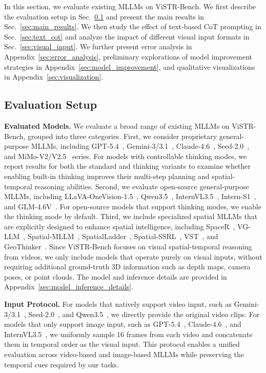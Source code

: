 In this section, we evaluate existing MLLMs on ViSTR-Bench.
We first describe the evaluation setup in Sec.~\ref{sec:evaluation_setup} and present the main results in Sec.~\ref{sec:main_results}.
We then study the effect of text-based CoT prompting in Sec.~\ref{sec:text_cot} and analyze the impact of different visual input formats in Sec.~\ref{sec:visual_input}.
We further present error analysis in Appendix~\ref{sec:error_analysis}, preliminary explorations of model improvement strategies in Appendix~\ref{sec:model_improvement}, and qualitative visualizations in Appendix~\ref{sec:visualization}.

\subsection{Evaluation Setup}
\label{sec:evaluation_setup}

\textbf{Evaluated Models.}
We evaluate a broad range of existing MLLMs on ViSTR-Bench, grouped into three categories. 
First, we consider proprietary general-purpose MLLMs, including GPT-5.4~\citep{GPT-5}, Gemini-3/3.1~\citep{Gemini}, Claude-4.6~\citep{Claude}, Seed-2.0~\citep{Seed}, and MiMo-V2/V2.5~\citep{MiMo-V2-Omni,MiMo-V2.5} series. 
For models with controllable thinking modes, we report results for both the standard and thinking variants to examine whether enabling built-in thinking improves their multi-step planning and spatial-temporal reasoning abilities. 
Second, we evaluate open-source general-purpose MLLMs, including LLaVA-OneVision-1.5~\citep{LLaVA-OneVision-1.5}, Qwen3.5~\citep{Qwen3.5}, InternVL3.5~\citep{InternVL3.5}, Intern-S1~\citep{Intern-S1,Intern-S1-Pro}, and GLM-4.6V~\citep{GLM-4.6V}.
For open-source models that support thinking modes, we enable the thinking mode by default. 
Third, we include specialized spatial MLLMs that are explicitly designed to enhance spatial intelligence, including SpaceR~\citep{SpaceR}, VG-LLM~\citep{VG-LLM}, Spatial-MLLM~\citep{Spatial-MLLM}, SpatialLadder~\citep{SpatialLadder}, Spatial-SSRL~\citep{Spatial-SSRL}, VST~\citep{VST}, and GeoThinker~\citep{GeoThinker}. 
Since ViSTR-Bench focuses on visual spatial-temporal reasoning from videos, we only include models that operate purely on visual inputs, without requiring additional ground-truth 3D information such as depth maps, camera poses, or point clouds.
The model and inference details are provided in Appendix~\ref{sec:model_inference_details}.

\textbf{Input Protocol.}
For models that natively support video input, such as Gemini-3/3.1~\citep{Gemini}, Seed-2.0~\citep{Seed}, and Qwen3.5~\citep{Qwen3.5}, we directly provide the original video clips.
For models that only support image input, such as GPT-5.4~\citep{GPT-5}, Claude-4.6~\citep{Claude}, and InternVL3.5~\citep{InternVL3.5}, we uniformly sample 16 frames from each video and concatenate them in temporal order as the visual input.
This protocol enables a unified evaluation across video-based and image-based MLLMs while preserving the temporal cues required by our tasks.

